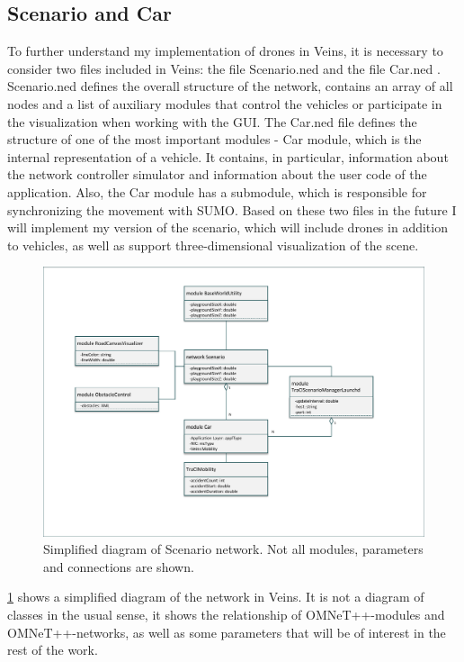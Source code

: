 \documentclass[]{nsm-thesis}
\begin{document}
\subsection {Scenario and Car}
\label{sec:scenarioned}

To further understand my implementation of drones in Veins, it is necessary to consider two files included in Veins: the file Scenario.ned \cite{scenarioned} and the file Car.ned \cite{carned}. Scenario.ned defines the overall structure of the network, contains an array of all nodes and a list of auxiliary modules that control the vehicles or participate in the visualization when working with the GUI. The Car.ned file defines the structure of one of the most important modules - Car module, which is the internal representation of a vehicle. It contains, in particular, information about the network controller simulator and information about the user code of the application. Also, the Car module has a submodule, which is responsible for synchronizing the movement with SUMO. Based on these two files in the future I will implement my version of the scenario, which will include drones in addition to vehicles, as well as support three-dimensional visualization of the scene. 

\begin{figure}
	\centering
	\includegraphics[width=1\textwidth]{figures/Scenario.pdf}
	\caption{Simplified diagram of Scenario \cite{scenarioned} network. Not all modules, parameters and connections are shown.}
	\label{fig:scenarioned}
\end{figure}

\cref{fig:scenarioned} shows a simplified diagram of the network in Veins. It is not a diagram of classes in the usual sense, it shows the relationship of OMNeT++-modules and OMNeT++-networks, as well as some parameters that will be of interest in the rest of the work. 
\end{document}
